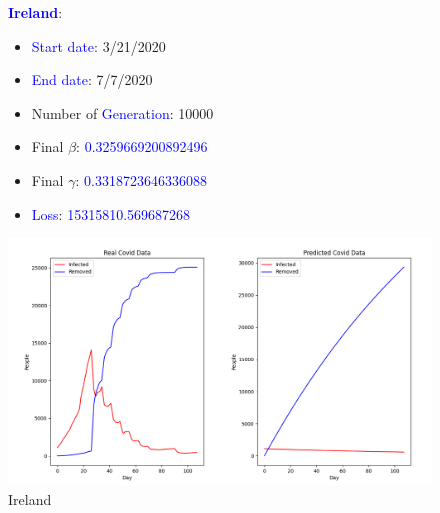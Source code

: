 \documentclass[a4paper]{article}
\begin{document}
    \begin{figure}[ht]
    \centering
    \textbf{\textcolor{blue}{Ireland}}: 
    \begin{itemize}
        \item \textcolor{blue}{Start date}: 3/21/2020
        \item \textcolor{blue}{End date}: 7/7/2020
        \item Number of \textcolor{blue}{Generation}: 10000
        \item Final $\beta$: \textcolor{blue}{0.3259669200892496}
        \item Final $\gamma$: \textcolor{blue}{0.3318723646336088}
        \item \textcolor{blue}{Loss}: \textcolor{blue}{15315810.569687268}
    \end{itemize}
    
    \includegraphics[width= \linewidth]{ex5-plot/Ireland.png}
    \caption{Ireland}
     \end{figure} 
     
\end{document}
